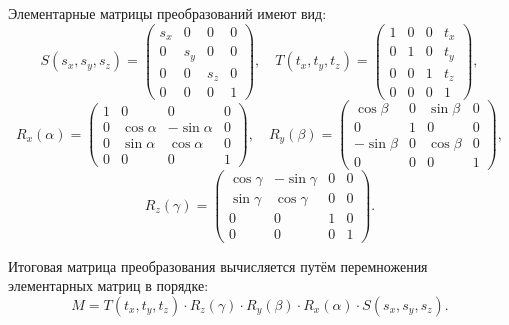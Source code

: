 \documentclass[11pt,a4paper]{article}
\begin{document}
Элементарные матрицы преобразований имеют вид:
\begin{equation}
    S(s_x, s_y, s_z) = \begin{pmatrix}
        s_x & 0 & 0 & 0 \\
        0 & s_y & 0 & 0 \\
        0 & 0 & s_z & 0 \\
        0 & 0 & 0 & 1
    \end{pmatrix}, \quad
    T(t_x, t_y, t_z) = \begin{pmatrix}
        1 & 0 & 0 & t_x \\
        0 & 1 & 0 & t_y \\
        0 & 0 & 1 & t_z \\
        0 & 0 & 0 & 1
    \end{pmatrix},
\end{equation}
\begin{equation}
    R_x(\alpha) = \begin{pmatrix}
        1 & 0 & 0 & 0 \\
        0 & \cos\alpha & -\sin\alpha & 0 \\
        0 & \sin\alpha & \cos\alpha & 0 \\
        0 & 0 & 0 & 1
    \end{pmatrix}, \quad
    R_y(\beta) = \begin{pmatrix}
        \cos\beta & 0 & \sin\beta & 0 \\
        0 & 1 & 0 & 0 \\
        -\sin\beta & 0 & \cos\beta & 0 \\
        0 & 0 & 0 & 1
    \end{pmatrix},
\end{equation}
\begin{equation}
    R_z(\gamma) = \begin{pmatrix}
        \cos\gamma & -\sin\gamma & 0 & 0 \\
        \sin\gamma & \cos\gamma & 0 & 0 \\
        0 & 0 & 1 & 0 \\
        0 & 0 & 0 & 1
    \end{pmatrix}.
\end{equation}

Итоговая матрица преобразования вычисляется путём перемножения элементарных матриц в порядке:
\begin{equation}
    M = T(t_x, t_y, t_z) \cdot R_z(\gamma) \cdot R_y(\beta) \cdot R_x(\alpha) \cdot S(s_x, s_y, s_z).
\end{equation}
\end{document}
